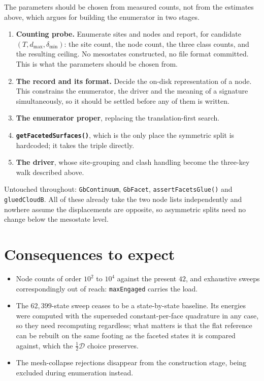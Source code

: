 \documentclass[11pt]{article}
\newcommand{\D}{\mathcal{D}}
\newcommand{\dmax}{d_{\max}}
\newcommand{\dmin}{\delta_{\min}}
\begin{document}
The parameters should be chosen from measured counts, not from the estimates
above, which argues for building the enumerator in two stages.

\begin{enumerate}
  \item \textbf{Counting probe.} Enumerate sites and nodes and report, for
        candidate $(T, \dmax, \dmin)$: the site count, the node count, the three
        class counts, and the resulting ceiling. No mesostates constructed, no
        file format committed. This is what the parameters should be chosen
        from.
  \item \textbf{The record and its format.} Decide the on-disk representation of
        a node. This constrains the enumerator, the driver and the meaning of a
        signature simultaneously, so it should be settled before any of them is
        written.
  \item \textbf{The enumerator proper}, replacing the translation-first search.
  \item \textbf{\texttt{getFacetedSurfaces()}}, which is the only place the
        symmetric split is hardcoded; it takes the triple directly.
  \item \textbf{The driver}, whose site-grouping and clash handling become the
        three-key walk described above.
\end{enumerate}

Untouched throughout: \texttt{GbContinuum}, \texttt{GbFacet},
\texttt{assertFacetsGlue()} and \texttt{gluedCloudB}. All of these already take
the two node lists independently and nowhere assume the displacements are
opposite, so asymmetric splits need no change below the mesostate level.

\section*{Consequences to expect}

\begin{itemize}
  \item Node counts of order $10^2$ to $10^4$ against the present $42$, and
        exhaustive sweeps correspondingly out of reach: \texttt{maxEngaged}
        carries the load.
  \item The $62{,}399$-state sweep ceases to be a state-by-state baseline. Its
        energies were computed with the superseded constant-per-face quadrature
        in any case, so they need recomputing regardless; what matters is that
        the flat reference can be rebuilt on the same footing as the faceted
        states it is compared against, which the $\tfrac{1}{2}\D$ choice
        preserves.
  \item The mesh-collapse rejections disappear from the construction stage,
        being excluded during enumeration instead.
\end{itemize}
\end{document}

